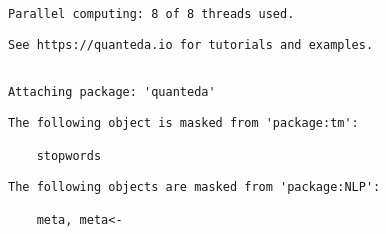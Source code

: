 \documentclass[
  12pt,
  letterpaper,
  DIV=11,
  numbers=noendperiod]{scrartcl}
\begin{document}
\begin{verbatim}
Parallel computing: 8 of 8 threads used.
\end{verbatim}

\begin{verbatim}
See https://quanteda.io for tutorials and examples.
\end{verbatim}

\begin{verbatim}

Attaching package: 'quanteda'
\end{verbatim}

\begin{verbatim}
The following object is masked from 'package:tm':

    stopwords
\end{verbatim}

\begin{verbatim}
The following objects are masked from 'package:NLP':

    meta, meta<-
\end{verbatim}
\end{document}
